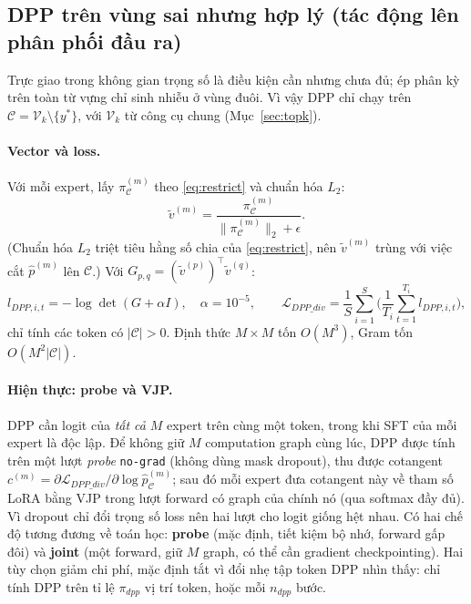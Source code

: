 \documentclass[12pt,a4paper]{article}
\theoremstyle{plain}
\newcommand{\Vk}{\mathcal V_k}
\newcommand{\Cset}{\mathcal C}
\newcommand{\ytar}{y^{*}}
\begin{document}
\subsection{DPP trên vùng sai nhưng hợp lý (tác động lên phân phối đầu ra)}
\label{sec:dpp}

Trực giao trong không gian trọng số là điều kiện cần nhưng chưa đủ; ép phân kỳ trên toàn từ vựng chỉ sinh nhiễu ở vùng đuôi. Vì vậy DPP chỉ chạy trên $\Cset=\Vk\setminus\{\ytar\}$, với $\Vk$ từ công cụ chung (Mục~\ref{sec:topk}).

\paragraph{Vector và loss.}
Với mỗi expert, lấy $\pi^{(m)}_{\Cset}$ theo \eqref{eq:restrict} và chuẩn hóa $L_2$:
\begin{equation}
\tilde v^{(m)}=\frac{\pi^{(m)}_{\Cset}}{\|\pi^{(m)}_{\Cset}\|_2+\epsilon}.
\end{equation}
(Chuẩn hóa $L_2$ triệt tiêu hằng số chia của \eqref{eq:restrict}, nên $\tilde v^{(m)}$ trùng với việc cắt $\hat p^{(m)}$ lên $\Cset$.) Với $G_{p,q}=(\tilde v^{(p)})^\top\tilde v^{(q)}$:
\begin{equation}
l_{DPP,i,t}=-\log\det(G+\alpha I),\quad \alpha=10^{-5},\qquad
\mathcal L_{DPP\_div}=\frac1S\sum_{i=1}^S\Big(\frac1{T_i}\sum_{t=1}^{T_i}l_{DPP,i,t}\Big),
\label{eq:dppsteploss}
\end{equation}
chỉ tính các token có $|\Cset|>0$. Định thức $M\times M$ tốn $O(M^3)$, Gram tốn $O(M^2|\Cset|)$.

\paragraph{Hiện thực: probe và VJP.}
DPP cần logit của \emph{tất cả} $M$ expert trên cùng một token, trong khi SFT của mỗi expert là độc lập. Để không giữ $M$ computation graph cùng lúc, DPP được tính trên một lượt \emph{probe} \texttt{no-grad} (không dùng mask dropout), thu được cotangent $c^{(m)}=\partial\mathcal L_{DPP\_div}/\partial\log\hat p^{(m)}_{\Cset}$; sau đó mỗi expert đưa cotangent này về tham số LoRA bằng VJP trong lượt forward có graph của chính nó (qua softmax đầy đủ). Vì dropout chỉ đổi trọng số loss nên hai lượt cho logit giống hệt nhau. Có hai chế độ tương đương về toán học: \textbf{probe} (mặc định, tiết kiệm bộ nhớ, forward gấp đôi) và \textbf{joint} (một forward, giữ $M$ graph, có thể cần gradient checkpointing). Hai tùy chọn giảm chi phí, mặc định tắt vì đổi nhẹ tập token DPP nhìn thấy: chỉ tính DPP trên tỉ lệ $\pi_{dpp}$ vị trí token, hoặc mỗi $n_{dpp}$ bước.
\end{document}
